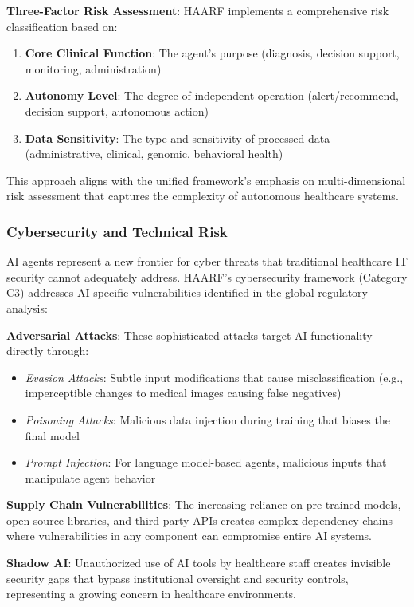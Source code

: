 \documentclass[11pt]{article}
\begin{document}
\textbf{Three-Factor Risk Assessment}: HAARF implements a comprehensive risk classification based on:
\begin{enumerate}
    \item \textbf{Core Clinical Function}: The agent's purpose (diagnosis, decision support, monitoring, administration)
    \item \textbf{Autonomy Level}: The degree of independent operation (alert/recommend, decision support, autonomous action)  
    \item \textbf{Data Sensitivity}: The type and sensitivity of processed data (administrative, clinical, genomic, behavioral health)
\end{enumerate}

This approach aligns with the unified framework's emphasis on multi-dimensional risk assessment that captures the complexity of autonomous healthcare systems.

\subsubsection{Cybersecurity and Technical Risk}

AI agents represent a new frontier for cyber threats that traditional healthcare IT security cannot adequately address. HAARF's cybersecurity framework (Category C3) addresses AI-specific vulnerabilities identified in the global regulatory analysis:

\textbf{Adversarial Attacks}: These sophisticated attacks target AI functionality directly through:
\begin{itemize}
    \item \textit{Evasion Attacks}: Subtle input modifications that cause misclassification (e.g., imperceptible changes to medical images causing false negatives)
    \item \textit{Poisoning Attacks}: Malicious data injection during training that biases the final model
    \item \textit{Prompt Injection}: For language model-based agents, malicious inputs that manipulate agent behavior \cite{owasp2024aisvs}
\end{itemize}

\textbf{Supply Chain Vulnerabilities}: The increasing reliance on pre-trained models, open-source libraries, and third-party APIs creates complex dependency chains where vulnerabilities in any component can compromise entire AI systems.

\textbf{Shadow AI}: Unauthorized use of AI tools by healthcare staff creates invisible security gaps that bypass institutional oversight and security controls, representing a growing concern in healthcare environments.
\end{document}
